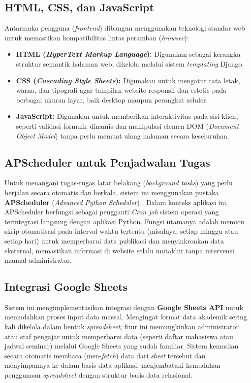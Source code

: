 \subsection{HTML, CSS, dan JavaScript}
Antarmuka pengguna (\textit{frontend}) dibangun menggunakan teknologi standar web untuk memastikan kompatibilitas lintas peramban (\textit{browser}):
\begin{itemize}
    \item \textbf{HTML (\textit{HyperText Markup Language}):} Digunakan sebagai kerangka struktur semantik halaman web, dikelola melalui sistem \textit{templating} Django.
    \item \textbf{CSS (\textit{Cascading Style Sheets}):} Digunakan untuk mengatur tata letak, warna, dan tipografi agar tampilan website responsif dan estetis pada berbagai ukuran layar, baik desktop maupun perangkat seluler.
    \item \textbf{JavaScript:} Digunakan untuk memberikan interaktivitas pada sisi klien, seperti validasi formulir dinamis dan manipulasi elemen DOM (\textit{Document Object Model}) tanpa perlu memuat ulang halaman secara keseluruhan.
\end{itemize}

\subsection{APScheduler untuk Penjadwalan Tugas}
Untuk menangani tugas-tugas latar belakang (\textit{background tasks}) yang perlu berjalan secara otomatis dan berkala, sistem ini menggunakan pustaka \textbf{APScheduler} (\textit{Advanced Python Scheduler}) \cite{apscheduler}. 
Dalam konteks aplikasi ini, APScheduler berfungsi sebagai pengganti \textit{Cron job} sistem operasi yang terintegrasi langsung dengan aplikasi Python. Fungsi utamanya adalah memicu skrip otomatisasi pada interval waktu tertentu (misalnya, setiap minggu atau setiap hari) untuk memperbarui data publikasi dan menyinkronkan data eksternal, memastikan informasi di website selalu mutakhir tanpa intervensi manual administrator.

\subsection{Integrasi Google Sheets}
Sistem ini mengimplementasikan integrasi dengan \textbf{Google Sheets API} untuk memudahkan proses input data massal. Mengingat format data akademik sering kali dikelola dalam bentuk \textit{spreadsheet}, fitur ini memungkinkan administrator atau staf pengajar untuk memperbarui data (seperti daftar mahasiswa atau jadwal seminar) melalui Google Sheets yang sudah familiar. 
Sistem kemudian secara otomatis membaca (men-\textit{fetch}) data dari \textit{sheet} tersebut dan menyimpannya ke dalam basis data aplikasi, menjembatani kemudahan penggunaan \textit{spreadsheet} dengan struktur basis data relasional.


